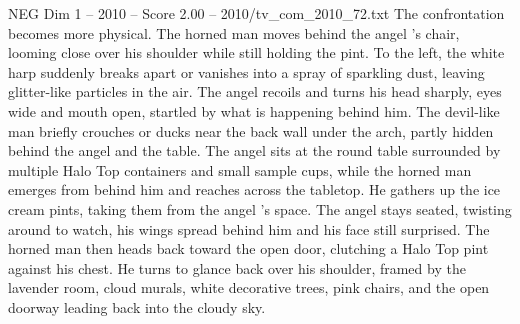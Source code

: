 \begin{textsample}{NEG Dim 1 – 2010 – Score 2.00 – 2010/tv\_com\_2010\_72.txt}
The confrontation becomes more physical.
The horned man moves behind the angel ’s chair, looming close over his shoulder while still holding the pint.
To the left, the white harp suddenly breaks apart or vanishes into a spray of sparkling dust, leaving glitter-like particles in the air.
The angel recoils and turns his head sharply, eyes wide and mouth open, startled by what is happening behind him.
The devil-like man briefly crouches or ducks near the back wall under the arch, partly hidden behind the angel and the table.
The angel sits at the round table surrounded by multiple Halo Top containers and small sample cups, while the horned man emerges from behind him and reaches across the tabletop.
He gathers up the ice cream pints, taking them from the angel ’s space.
The angel stays seated, twisting around to watch, his wings spread behind him and his face still surprised.
The horned man then heads back toward the open door, clutching a Halo Top pint against his chest.
He turns to glance back over his shoulder, framed by the lavender room, cloud murals, white decorative trees, pink chairs, and the open doorway leading back into the cloudy sky.

\end{textsample}
